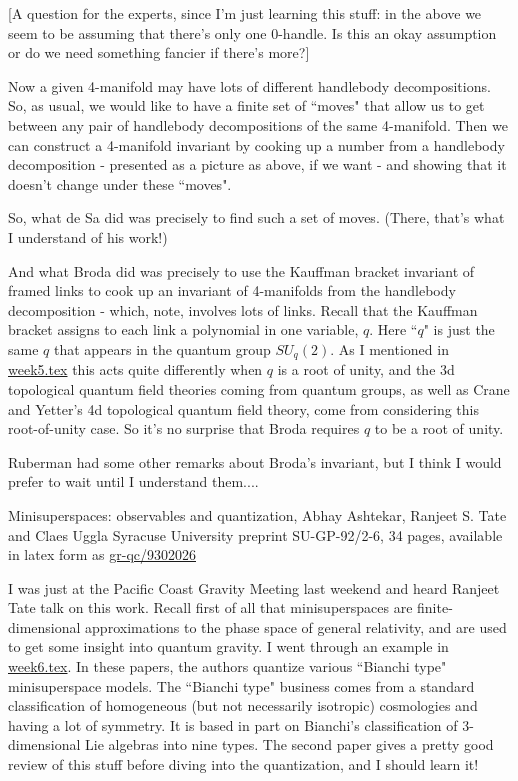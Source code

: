 [A question for the experts, since I'm just learning this stuff: in the above we seem to be assuming that there's only one 0-handle. Is this an okay assumption or do we need something fancier if there's more?]

Now a given 4-manifold may have lots of different handlebody decompositions. So, as usual, we would like to have a finite set of ``moves" that allow us to get between any pair of handlebody decompositions of the same 4-manifold. Then we can construct a 4-manifold invariant by cooking up a number from a handlebody decomposition - presented as a picture as above, if we want - and showing that it doesn't change under these ``moves".

So, what de Sa did was precisely to find such a set of moves. (There, that's what I understand of his work!)

And what Broda did was precisely to use the Kauffman bracket invariant of framed links to cook up an invariant of 4-manifolds from the handlebody decomposition - which, note, involves lots of links. Recall that the Kauffman bracket assigns to each link a polynomial in one variable, $q$. Here ``$q$" is just the same $q$ that appears in the quantum group $SU_q(2)$. As I mentioned in {\hyperref[week5]{week5.tex}} this acts quite differently when $q$ is a root of unity, and the 3d topological quantum field theories coming from quantum groups, as well as Crane and Yetter's 4d topological quantum field theory, come from considering this root-of-unity case. So it's no surprise that Broda requires $q$ to be a root of unity.

Ruberman had some other remarks about Broda's invariant, but I think I would prefer to wait until I understand them....


Minisuperspaces: observables and quantization, Abhay Ashtekar, Ranjeet S. Tate and Claes Uggla Syracuse University preprint SU-GP-92/2-6, 34 pages, available in latex form as \href{https://arxiv.org/abs/gr-qc/9302027}{gr-qc/9302026}

I was just at the Pacific Coast Gravity Meeting last weekend and heard Ranjeet Tate talk on this work. Recall first of all that minisuperspaces are finite-dimensional approximations to the phase space of general relativity, and are used to get some insight into quantum gravity. I went through an example in {\hyperref[week6]{week6.tex}}. In these papers, the authors quantize various ``Bianchi type" minisuperspace models. The ``Bianchi type" business comes from a standard classification of homogeneous (but not necessarily isotropic) cosmologies and having a lot of symmetry. It is based in part on Bianchi's classification of 3-dimensional Lie algebras into nine types. The second paper gives a pretty good review of this stuff before diving into the quantization, and I should learn it!


